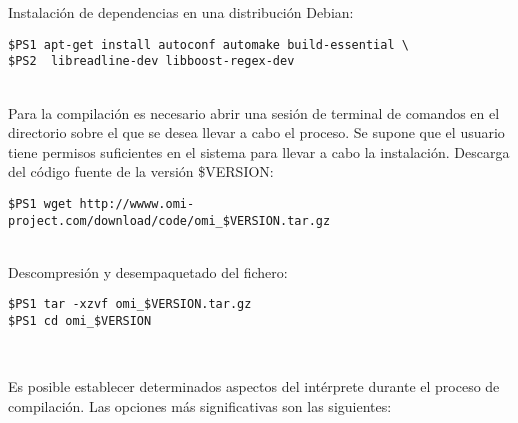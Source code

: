 Instalación de dependencias en una distribución Debian:\\
\lstset {language=bash}
\begin{lstlisting}
$PS1 apt-get install autoconf automake build-essential \
$PS2  libreadline-dev libboost-regex-dev
\end{lstlisting}
\hfill\\

Para la compilación es necesario abrir una sesión de terminal de comandos en el directorio sobre el
que se desea llevar a cabo el proceso. Se supone que el usuario tiene permisos suficientes en el 
sistema para llevar a cabo la instalación. Descarga del código fuente de la versión \$VERSION:\\

\begin{lstlisting}
$PS1 wget http://wwww.omi-project.com/download/code/omi_$VERSION.tar.gz
\end{lstlisting}
\hfill\\

Descompresión y desempaquetado del fichero:\\
\begin{lstlisting}
$PS1 tar -xzvf omi_$VERSION.tar.gz
$PS1 cd omi_$VERSION
\end{lstlisting}
\hfill\\
\pagebreak

Es posible establecer determinados aspectos del intérprete durante el proceso de compilación. Las opciones 
más significativas son las siguientes:


